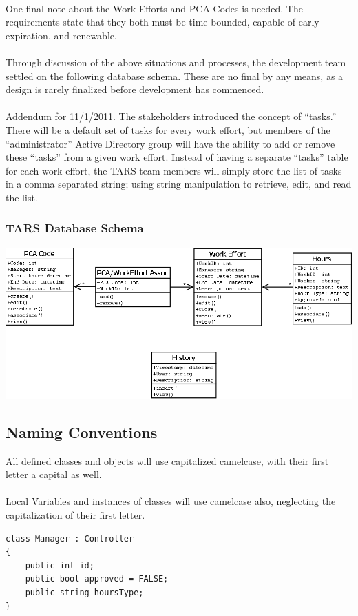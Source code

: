\documentclass[letterpaper]{article}
\begin{document}
\\
One final note about the Work Efforts and PCA Codes is needed. The requirements state that they both must be time-bounded, capable of early expiration, and renewable. \\
\\
Through discussion of the above situations and processes, the development team settled on the following database schema. These are no final by any means, as a design is rarely finalized before development has commenced.\\
\\
Addendum for 11/1/2011. The stakeholders introduced the concept of ``tasks.'' There will be a default set of tasks for every work effort, but members of the ``administrator'' Active Directory group will have the ability to add or remove these ``tasks'' from a given work effort. Instead of having a separate ``tasks'' table for each work effort, the TARS team members will simply store the list of tasks in a comma separated string; using string manipulation to retrieve, edit, and read the list.

\subsubsection{TARS Database Schema}
\includegraphics[scale=0.4]{../design/images/class_diagram_1.png}



\subsection{Naming Conventions}
All defined classes and objects will use capitalized camelcase, with their first letter a capital as well.\\
\\
Local Variables and instances of classes will use camelcase also, neglecting the capitalization of their first letter.
\begin{verbatim}
class Manager : Controller
{
    public int id;
    public bool approved = FALSE;
    public string hoursType;
}
\end{verbatim}
\end{document}
